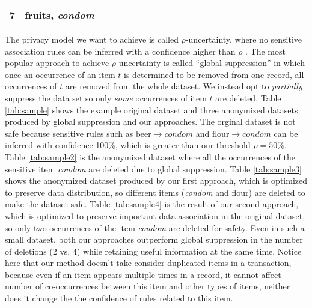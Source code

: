 \begin{table*}[th]
{{\begin{tabular}{|c|l|}
7& fruits, {\em condom}  \\ \hline
\end{tabular}
\label{tab:sample3}
}
}
\end{table*}

The privacy model we want to achieve is called $\rho$-uncertainty, where
no sensitive association rules can be inferred with a confidence higher than
$\rho$ \cite{Cao:2010:rho}.
%
The most popular approach to achieve $\rho$-uncertainty is called ``global
suppression'' \cite{Cao:2010:rho} in which once an occurrence of an item $t$ is
determined to be removed from one record, all occurrences of $t$ are
removed from the whole dataset. We instead opt to {\em partially}
suppress the data set so only {\em some} occurrences of item $t$ are
deleted.
Table \ref{tab:sample} shows the example original dataset
and three anonymized datasets produced by global suppression and our approaches.
The orginal dataset is not safe because sensitive rules such as
$\text{beer} \rightarrow condom$ and $\text{flour} \rightarrow condom$
can be inferred with confidence 100\%, which is greater than our threshold $\rho=50\%$.
Table \ref{tab:sample2} is the anonymized dataset where all the occurrences of
the sensitive item {\em condom} are deleted due to global suppression.
Table \ref{tab:sample3} shows the anonymized dataset produced by our first
approach, which is optimized to preserve data distribution, so different
items ({\em condom} and flour) are deleted to make the dataset safe.
Table \ref{tab:sample4} is the result of our second approach, which is optimized
to preserve important data association in the original dataset, so only
two occurrences of the item {\em condom} are deleted for safety.
Even in such a small dataset, both our approaches outperform global suppression
in the number of deletions (2 vs. 4) while retaining useful information at the same time.
Notice here that our method doesn't take consider duplicated items in a transaction,
because even if an item appears multiple times in a record, it cannot affect number of co-occurrences
between this item and other types of items, neither does it change the 
the confidence of rules related to this item. 

